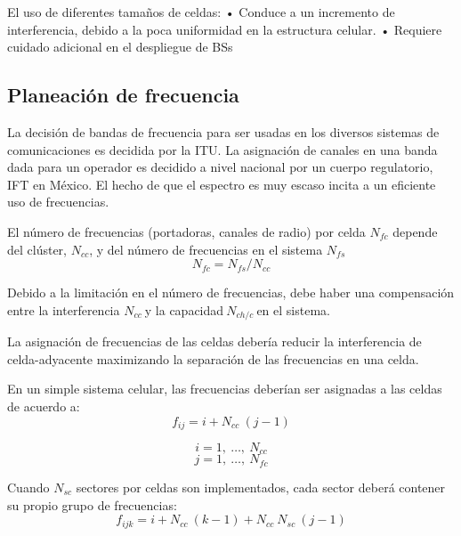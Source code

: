 El uso de diferentes tamaños de celdas:\newline
•	Conduce a un incremento de interferencia, debido a la poca uniformidad en la estructura celular.\newline
•	Requiere cuidado adicional en el despliegue de BSs

\subsection{Planeación de frecuencia}
La decisión de bandas de frecuencia para ser usadas en los diversos sistemas de comunicaciones es decidida por la ITU. La asignación de canales en una banda dada para un operador es decidido a nivel nacional por un cuerpo regulatorio, IFT en México. El hecho de que el espectro es muy escaso incita a un eficiente uso de frecuencias.\newline

El número de frecuencias (portadoras, canales de radio) por celda $N_{fc}$ depende del clúster, $N_{cc}$, y del número de frecuencias en el sistema $N_{fs}$
\begin{equation}
    N_{fc}={N_{fs}}/{N_{cc}}
    \label{eqn:Nfc}
\end{equation}

Debido a la limitación en el número de frecuencias, debe haber una compensación entre la interferencia $N_{cc}\ $y la capacidad$\ N_{ch/c}\ $en el sistema.\newline

La asignación de frecuencias de las celdas debería reducir la interferencia de celda-adyacente maximizando la separación de las frecuencias en una celda.\newline

En un simple sistema celular, las frecuencias deberían ser asignadas a las celdas de acuerdo a:\newline
\begin{equation}
    f_{ij}=i+N_{cc}\ (j-1)
    \label{eqn:fij}
\end{equation}

\[i=1,\ \dots ,\ N_{cc}\] 
\[j=1,\ \dots ,\ N_{fc}\] 

Cuando $N_{sc}$ sectores por celdas son implementados, cada sector deberá contener su propio grupo de frecuencias:\newline
\begin{equation}
    f_{ijk}=i+N_{cc}\ \left(k-1\right)+N_{cc}\ N_{sc}\ (j-1)
    \label{eqn:fijk}
\end{equation}

